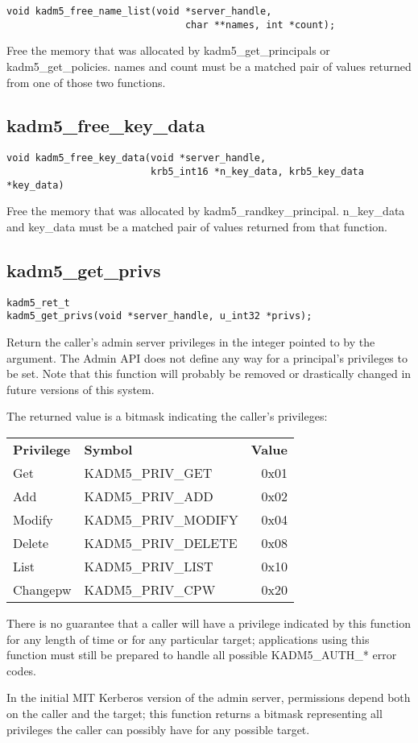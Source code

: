\begin{verbatim}
void kadm5_free_name_list(void *server_handle,
                               char **names, int *count);
\end{verbatim}

Free the memory that was allocated by kadm5_get_principals or
kadm5_get_policies.  names and count must be a matched pair of
values returned from one of those two functions.

\subsection{kadm5_free_key_data}

\begin{verbatim}
void kadm5_free_key_data(void *server_handle,
                         krb5_int16 *n_key_data, krb5_key_data *key_data)
\end{verbatim}

Free the memory that was allocated by kadm5_randkey_principal.
n_key_data and key_data must be a matched pair of values returned from
that function.

\subsection{kadm5_get_privs}

\begin{verbatim}
kadm5_ret_t
kadm5_get_privs(void *server_handle, u_int32 *privs);
\end{verbatim}

Return the caller's admin server privileges in the integer pointed to
by the argument.  The Admin API does not define any way for a
principal's privileges to be set.  Note that this function will
probably be removed or drastically changed in future versions of this
system.

The returned value is a bitmask indicating the caller's privileges:

\begin{tabular}{llr}
{\bf Privilege} & {\bf Symbol} & {\bf Value} \\
Get & KADM5_PRIV_GET & 0x01 \\
Add & KADM5_PRIV_ADD & 0x02 \\
Modify & KADM5_PRIV_MODIFY & 0x04 \\
Delete & KADM5_PRIV_DELETE & 0x08 \\
List & KADM5_PRIV_LIST & 0x10 \\
Changepw & KADM5_PRIV_CPW & 0x20
\end{tabular}

There is no guarantee that a caller will have a privilege indicated by
this function for any length of time or for any particular target;
applications using this function must still be prepared to handle all
possible KADM5_AUTH_* error codes.

In the initial MIT Kerberos version of the admin server, permissions
depend both on the caller and the target; this function returns a
bitmask representing all privileges the caller can possibly have for
any possible target.



